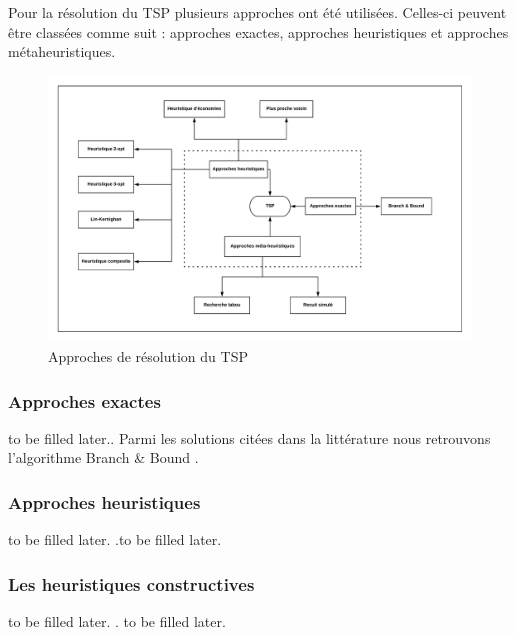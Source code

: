 Pour la résolution du TSP plusieurs approches ont été utilisées. Celles-ci peuvent être classées comme suit : approches exactes, approches heuristiques et approches métaheuristiques.

\medskip

\begin{figure}[hbt!]
  \centering
  \includegraphics[width=15cm]{images_pfe/TSP_RESOLUTION_APPROCHES.png}
  \caption{Approches de résolution du TSP}
  \label{fig:tsp-solutions}
\end{figure}
\FloatBarrier

\medskip

\subsubsection{Approches exactes}to be filled later.. Parmi les solutions citées dans la littérature nous retrouvons l'algorithme Branch \& Bound \parencite{diderich_solving_1996,cotta_hybridizing_1995, tschoke_solving_1995}.

\medskip

\subsubsection{Approches heuristiques}to be filled later. \parencite{anbuudayasankar_survey_2014}.to be filled later.


\medskip

\subsubsection{Les heuristiques constructives}to be filled later. \parencite{anbuudayasankar_survey_2014}. to be filled later.
\medskip

